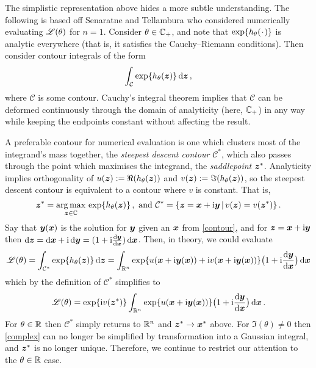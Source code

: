 \begin{remark}


The simplistic representation above hides a more subtle understanding. The following is based off Senaratne and Tellambura \cite{senaratne2009numerical} who considered numerically evaluating $\mathscr{L}(\theta)$ for $n=1$. Consider $\theta \in \mathbb{C}_+$, and note that $\exp\{ h_\theta(\argdot) \}$ is analytic everywhere (that is, it satisfies the Cauchy--Riemann conditions). Then consider contour integrals of the form
\[ \int_{\mathcal{C}} \exp\{ h_\theta(\bm{z}) \} \mathop{}\!\mathrm{d} \bm{z} \,, \]
where $\mathcal{C}$ is some contour. Cauchy's integral theorem implies that $\mathcal{C}$ can be deformed continuously through the domain of analyticity (here, $\mathbb{C}_+$) in any way while keeping the endpoints constant without affecting the result.

A preferable contour for numerical evaluation is one which clusters most of the integrand's mass together, the \emph{steepest descent contour} $\mathcal{C}^*$, which also passes through the point which maximises the integrand, the \emph{saddlepoint} $\bm{z}^*$. Analyticity implies orthogonality of $u(\bm{z}) := \Re(h_\theta(\bm{z}))$ and $v(\bm{z}) := \Im(h_\theta(\bm{z}))$,
so the steepest descent contour is equivalent to a contour where $v$ is constant. That is,
\begin{equation} \label{contour}
	\bm{z}^* = \operatorname*{arg\,max}_{\bm{z} \in \mathbb{C}} \, \exp\{ h_\theta(\bm{z}) \} \,, \text{ and } \mathcal{C}^* = \{ \bm{z} = \bm{x}+\mathrm{i} \bm{y} \,|\, v(\bm{z}) = v(\bm{z}^*) \} \,.
\end{equation}
Say that $\bm{y}(\bm{x})$ is the solution for $\bm{y}$ given an $\bm{x}$ from \eqref{contour}, and for $\bm{z} = \bm{x} + \mathrm{i} \bm{y}$ then $\mathop{}\!\mathrm{d} \bm{z} = \mathop{}\!\mathrm{d} \bm{x} + \mathrm{i} \mathop{}\!\mathrm{d} \bm{y} = (1 + \mathrm{i} \frac{\mathop{}\!\mathrm{d} \bm{y}}{\mathop{}\!\mathrm{d} \bm{x}}) \mathop{}\!\mathrm{d} \bm{x}$. Then, in theory, we could evaluate
\[ \mathscr{L}(\theta) = \int_{\mathcal{C}^*} \exp\{ h_\theta(\bm{z}) \} \mathop{}\!\mathrm{d} \bm{z} = \int_{\mathbb{R}^n} \exp\{ u(\bm{x} + \mathrm{i} \bm{y}(\bm{x})) + \mathrm{i} v(\bm{x} + \mathrm{i} \bm{y}(\bm{x})) \} \bigl(1 + \mathrm{i} \frac{\mathop{}\!\mathrm{d} \bm{y}}{\mathop{}\!\mathrm{d} \bm{x}} \bigr) \mathop{}\!\mathrm{d} \bm{x} \]
which by the definition of $\mathcal{C}^*$ simplifies to
\begin{equation} \label{complex}
	\mathscr{L}(\theta) = \exp\{\mathrm{i} v(\bm{z}^*)\} \int_{\mathbb{R}^n} \exp\{u(\bm{x} + \mathrm{i} \bm{y}(\bm{x}))\} \bigl(1 + \mathrm{i} \frac{\mathop{}\!\mathrm{d} \bm{y}}{\mathop{}\!\mathrm{d} \bm{x}} \bigr) \mathop{}\!\mathrm{d} \bm{x} \,.
\end{equation}
For $\theta \in \mathbb{R}$ then $\mathcal{C}^*$ simply returns to $\mathbb{R}^n$ and $\bm{z}^* \to \bm{x}^*$ above.
For $\Im(\theta) \not= 0$ then \eqref{complex} can no longer be simplified by transformation into a Gaussian integral, and $\bm{z}^*$ is no longer unique. Therefore, we continue to restrict our attention to the $\theta \in \mathbb{R}$ case. \remQED
\end{remark}

